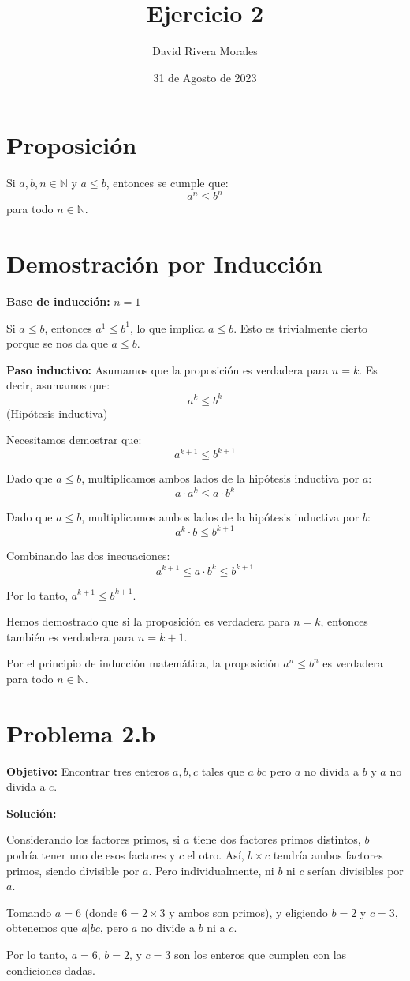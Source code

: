 \documentclass[12pt,a4paper]{article}
\begin{document}
\title{Ejercicio 2}
\author{David Rivera Morales}
\date{31 de Agosto de 2023}
\maketitle

\section*{Proposición}
Si \(a, b, n \in \mathbb{N}\) y \(a \leq b\), entonces se cumple que:
\[a^n \leq b^n\]
para todo \(n \in \mathbb{N}\).

\section*{Demostración por Inducción}

\textbf{Base de inducción:} \(n = 1\)

Si \(a \leq b\), entonces \(a^1 \leq b^1\), lo que implica \(a \leq b\). Esto es trivialmente cierto porque se nos da que \(a \leq b\).

\textbf{Paso inductivo:} Asumamos que la proposición es verdadera para \(n = k\). Es decir, asumamos que:
\[a^k \leq b^k\] (Hipótesis inductiva)

Necesitamos demostrar que:
\[a^{k+1} \leq b^{k+1}\]

Dado que \(a \leq b\), multiplicamos ambos lados de la hipótesis inductiva por \(a\):
\[a \cdot a^k \leq a \cdot b^k\]

Dado que \(a \leq b\), multiplicamos ambos lados de la hipótesis inductiva por \(b\):
\[a^k \cdot b \leq b^{k+1}\]

Combinando las dos inecuaciones:
\[a^{k+1} \leq a \cdot b^k \leq b^{k+1}\]

Por lo tanto, \(a^{k+1} \leq b^{k+1}\).

Hemos demostrado que si la proposición es verdadera para \(n = k\), entonces también es verdadera para \(n = k + 1\).

Por el principio de inducción matemática, la proposición \(a^n \leq b^n\) es verdadera para todo \(n \in \mathbb{N}\).

\section*{Problema 2.b}

\textbf{Objetivo:} Encontrar tres enteros \(a, b, c\) tales que \(a | bc\) pero \(a\) no divida a \(b\) y \(a\) no divida a \(c\).

\textbf{Solución:}

Considerando los factores primos, si \(a\) tiene dos factores primos distintos, \(b\) podría tener uno de esos factores y \(c\) el otro. Así, \(b \times c\) tendría ambos factores primos, siendo divisible por \(a\). Pero individualmente, ni \(b\) ni \(c\) serían divisibles por \(a\).

Tomando \(a = 6\) (donde \(6 = 2 \times 3\) y ambos son primos), y eligiendo \(b = 2\) y \(c = 3\), obtenemos que \(a | bc\), pero \(a\) no divide a \(b\) ni a \(c\).

Por lo tanto, \(a = 6\), \(b = 2\), y \(c = 3\) son los enteros que cumplen con las condiciones dadas.
\end{document}
